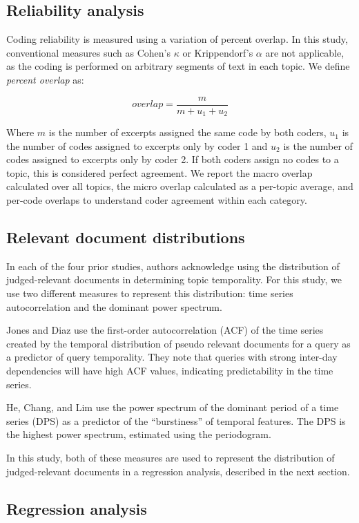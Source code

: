 \documentclass{sig-alternate}
\begin{document}
\subsection{Reliability analysis}
Coding reliability is measured using a variation of percent overlap.  In this study, conventional measures such as Cohen's $\kappa$ or Krippendorf's $\alpha$ are not applicable, as the coding is performed on arbitrary segments of text in each topic.  We define \emph{percent overlap} as:

\[
overlap = \frac{m}{m + u_1 + u_2} 
\]

Where $m$ is the number of excerpts assigned the same code by both coders, $u_1$ is the number of codes assigned to excerpts only by coder 1 and $u_2$ is the number of codes assigned to excerpts only by coder 2. If both coders assign no codes to a topic, this is considered perfect agreement. We report the macro overlap calculated over all topics, the micro overlap calculated as a per-topic average, and per-code overlaps to understand coder agreement within each category.

\subsection{Relevant document distributions}

In each of the four prior studies, authors acknowledge using the distribution of judged-relevant documents in determining topic temporality. For this study, we use two different measures to represent this distribution: time series autocorrelation and the dominant power spectrum.

Jones and Diaz \cite{Jones2007} use the first-order autocorrelation (ACF) of the time series created by the temporal distribution of pseudo relevant documents for a query as a predictor of query temporality. They note that queries with strong inter-day dependencies will have high ACF values, indicating predictability in the time series.

He, Chang, and Lim \cite{He2007} use the power spectrum of the dominant period of a time series (DPS) as a predictor of the ``burstiness'' of temporal features. The DPS is the highest power spectrum, estimated using the periodogram. 

In this study, both of these measures are used to represent the distribution of judged-relevant documents in a regression analysis, described in the next section.

\subsection{Regression analysis}
\end{document}
